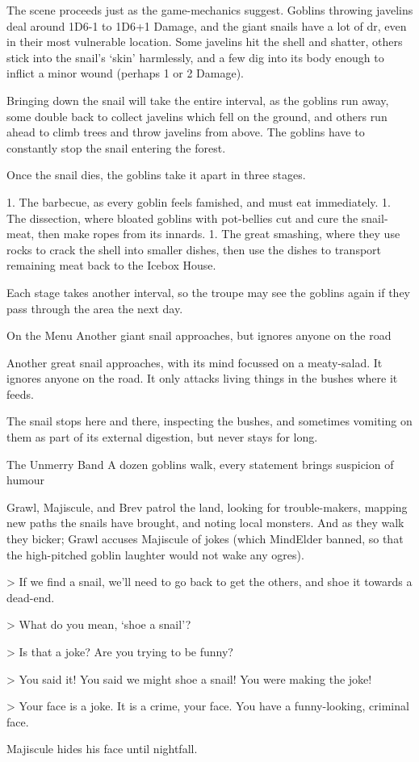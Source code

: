 The scene proceeds just as the game-mechanics suggest.
Goblins throwing javelins deal around 1D6-1 to 1D6+1 Damage, and the giant snails have a lot of \gls{dr}, even in their most vulnerable location.
Some javelins hit the shell and shatter, others stick into the snail's `skin' harmlessly, and a few dig into its body enough to inflict a minor wound (perhaps 1 or 2 Damage).

Bringing down the snail will take the entire \gls{interval}, as the goblins run away, some double back to collect javelins which fell on the ground, and others run ahead to climb trees and throw javelins from above.
The goblins have to constantly stop the snail entering the forest.

Once the snail dies,
the goblins take it apart in three stages.

1. The barbecue, as every goblin feels famished, and must eat immediately.
1. The dissection, where bloated goblins with pot-bellies cut and cure the snail-meat, then make ropes from its innards.
1. The great smashing, where they use rocks to crack the shell into smaller dishes, then use the dishes to transport remaining meat back to the Icebox House.

Each stage takes another \gls{interval}, so the troupe may see the goblins again if they pass through the area the next day.


{On the Menu}%
{Another giant snail approaches, but ignores anyone on the road}%

Another great snail approaches, with its mind focussed on a meaty-salad.
It ignores anyone on the road.
It only attacks living things in the bushes where it feeds.

The snail stops here and there, inspecting the bushes, and sometimes vomiting on them as part of its external digestion, but never stays for long.



{The Unmerry Band}%
{A dozen goblins walk, every statement brings suspicion of humour}%

Grawl, Majiscule, and Brev patrol the land, looking for trouble-makers, mapping new paths the snails have brought, and noting local monsters.
And as they walk they bicker; Grawl accuses Majiscule of jokes (which \gls{MindElder} banned, so that the high-pitched goblin laughter would not wake any ogres).

> If we find a snail, we'll need to go back to get the others, and shoe it towards a dead-end.

> What do you mean, `shoe a snail'?

> Is that a joke?  Are you trying to be funny?

> You said it!  You said we might shoe a snail!  You were making the joke!

> Your face is a joke.  It is a crime, your face.  You have a funny-looking, criminal face.

Majiscule hides his face until nightfall.
